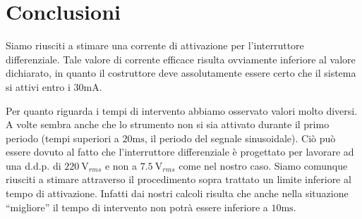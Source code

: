 \section{Conclusioni}
Siamo riusciti a stimare una corrente di attivazione per l'interruttore differenziale. Tale valore di corrente efficace risulta ovviamente inferiore al valore dichiarato, in quanto il costruttore deve assolutamente essere certo che il sistema si attivi entro i $30\si{\milli\ampere}$.

Per quanto riguarda i tempi di intervento abbiamo osservato valori molto diversi. A volte sembra anche che lo strumento non si sia attivato durante il primo periodo (tempi superiori a $20\si{\milli\second}$, il periodo del segnale sinusoidale). Ciò può essere dovuto al fatto che l'interruttore differenziale è progettato per lavorare ad una d.d.p. di $\SI{220}{\volt}_{rms}$ e non a $\SI{7.5}{\volt}_{rms}$ come nel nostro caso. Siamo comunque riusciti a stimare attraverso il procedimento sopra trattato un limite inferiore al tempo di attivazione. Infatti dai nostri calcoli risulta che anche nella situazione ``migliore'' il tempo di intervento non potrà essere inferiore a $10\si{\milli\second}$. %

